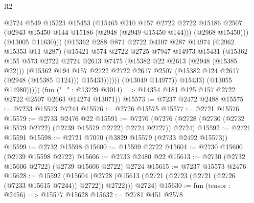 \begin{lexlean}{R2}
\begin{coremodule}
                            @2724
                            @549
                            @15223
                            @15453
                            (@15465
                              @210
                              @157
                              @2722
                              @2722
                              @15186
                              @2507
                              (@2943 @15450 @144 @15186 (@2948 (@2949 @15450 @144)))
                              (@2968 @15450)))
                          (@13005 @11630)))
                      (@15362
                        @288
                        @871
                        @2722
                        @4107
                        @287
                        @14974
                        (@2962 @15353 @11 @287)
                        (@15421
                          @574
                          @2722
                          @2725
                          @7947
                          @14973
                          @15431
                          (@15362
                            @155
                            @573
                            @2722
                            @2724
                            @2613
                            @7475
                            (@15382 @22 @2613 (@2948 (@15385 @22)))
                            (@15362
                              @194
                              @157
                              @2722
                              @2722
                              @2617
                              @2507
                              (@15382 @124 @2617 (@2948 (@15385 @124)))
                              @15433))))))
                  (@13049 @14977))
                @15433)
              (@13055 @14980)))))
      (fun ("_" : @13729 @3014) => @14354 @181 @125 @157 @2722 @2722 @2507 @2663 @14274 @13071))
@15573 := @7237 @2472 @2488
@15575 := @7233 @15573 @7244
@15576 := @2726 @15575
@15577 := @2721 @15576
@15579 := @2733 @2476 @22
@15591 := @7270 (@7276 (@2728 (@2730 (@2732 @15579 @2722) (@2739 @15579 @2722) @2724 @2727)) @2724)
@15592 := @2721 @15591
@15598 := @2721 @7070 (@3829 @15579 (@2733 @2492 @15573))
@15599 := @2732 @15598
@15600 := @15599 @2722
@15604 := @2730 @15600 (@2739 @15598 @2722)
@15606 := @2733 @2480 @22
@15613 := @2730 (@2732 @15606 @2722) (@2739 @15606 @2722) @2724
@15615 := @7237 @15573 @2476
@15628 := @15592
    (@15604 (@2728 (@15613 (@2721 (@2723 (@2721 (@2726 (@7233 @15615 @7244)) @2722)) @2722))) @2724)
@15630 := fun (tensor : @2456) => @15577 @15628
@15632 := @2781 @451 @2578

\end{coremodule}
\end{lexlean}
